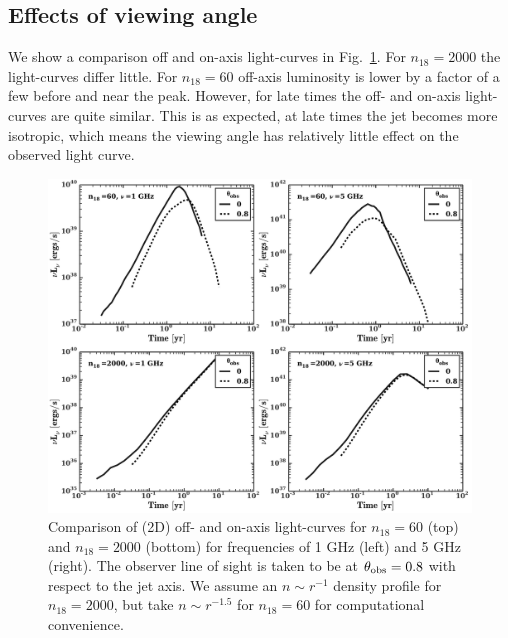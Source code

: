 \documentclass[usenatbib,fleqn]{mnras}
\begin{document}
\subsection{Effects of viewing angle}
We show a comparison off and on-axis light-curves in
Fig.~\ref{fig:onOff}.  For $n_{18}=2000$ the light-curves differ
little.  For $n_{18}=60$ off-axis luminosity is lower by a factor of a few
before and near the peak. However, for late times
the off- and on-axis light-curves are quite similar. This is as
expected, at late times the jet becomes more isotropic, which means
the viewing angle has relatively little effect on the observed light curve.

\begin{figure}
\includegraphics[width=16cm]{on_off.pdf}
\caption{\label{fig:onOff} Comparison of (2D) off- and on-axis
  light-curves for $n_{18}=60$ (top) and $n_{18}=2000$ (bottom) for
  frequencies of 1 GHz (left) and 5 GHz (right). The observer line of
  sight is taken to be at $\theta_{\rm obs}=0.8$ with respect to the
  jet axis. We assume an $n\sim r^{-1}$ density profile for
  $n_{18}=2000$, but take $n\sim r^{-1.5}$ for $n_{18}=60$ for
  computational convenience.}
\end{figure}

\end{document}
